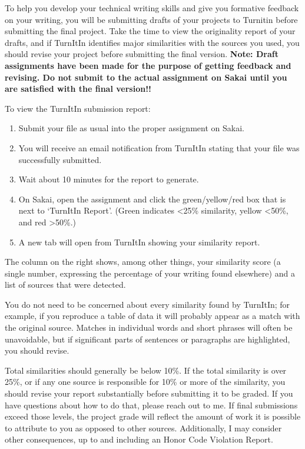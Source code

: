 \documentclass[11pt]{article}
\begin{document}
To help you develop your technical writing skills and give you formative feedback on your writing, you will be submitting drafts of your projects to Turnitin before submitting the final project.  Take the time to view the originality report of your drafts, and if TurnItIn identifies major similarities with the sources you used, you should revise your project before submitting the final version.  {\bf Note: Draft assignments have been made for the purpose of getting feedback and revising.  Do not submit to the actual assignment on Sakai until you are satisfied with the final version!!}  

To view the TurnItIn submission report:
\begin{enumerate}
\item Submit your file as usual into the proper assignment on Sakai.
\item You will receive an email notification from TurnItIn stating that your file was successfully submitted.
\item Wait about 10 minutes for the report to generate.
\item On Sakai, open the assignment and click the green/yellow/red box that is next to `TurnItIn Report'.
(Green indicates \textless 25\% similarity, yellow \textless 50\%, and red \textgreater 50\%.) 
\item A new tab will open from TurnItIn showing your similarity report.
\end{enumerate}
The column on the right shows, among other things, your similarity score (a single number, expressing the percentage of your writing found elsewhere) and a list of sources that were detected.  

You do not need to be concerned about every similarity found by TurnItIn; for example, if you reproduce a table of data it will probably appear as a match with the original source.  Matches in individual words and short phrases will often be unavoidable, but if significant parts of sentences or paragraphs are highlighted, you should revise.  

Total similarities should generally be below 10\%.  If the total similarity is over 25\%, or if any one source is responsible for 10\% or more of the similarity, you should revise your report substantially before submitting it to be graded.  If you have questions about how to do that, please reach out to me.  If final submissions exceed those levels, the project grade will reflect the amount of work it is possible to attribute to you as opposed to other sources.  Additionally, I may consider other consequences, up to and including an Honor Code Violation Report.  
\end{document}
